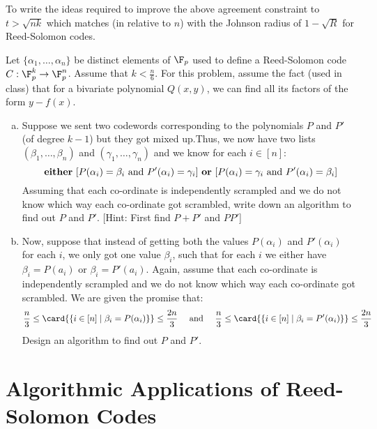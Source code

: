 \begin{curiousity}
To write the ideas required to improve the above agreement constraint to $t > \sqrt{nk}$ which matches (in relative to $n$) with the Johnson radius of $1-\sqrt{R}$ for Reed-Solomon codes.
\end{curiousity}

\begin{exercise-prob}
Let $\{\alpha_1, \ldots , \alpha_n\}$ be distinct elements of $\F_p$ used to define a Reed-Solomon code $C : \F_p^k \to \F_p^n$. Assume that $k < \frac{n}{6}$. For this problem, assume the fact (used in class) that for a bivariate polynomial $Q(x,y)$, we can
find all its factors of the form $y-f(x)$.
\begin{enumerate}[(a)]
\item Suppose we sent two codewords corresponding to the polynomials $P$ and $P'$ (of degree $k-1$) but they got mixed up.Thus, we now have two lists $(\beta_1, \ldots ,\beta_n)$ and
$(\gamma_1, \ldots, \gamma_n)$ and we know for each $i \in [n]$:
$$\textrm{ \textbf{either} [$P(\alpha_i) = \beta_i$ and $P'(\alpha_i) = \gamma_i$] \textbf{or} [$P(\alpha_i) = \gamma_i$ and $P'(\alpha_i) = \beta_i$]}$$
Assuming that each co-ordinate is independently scrampled and we do not know which way each co-ordinate got scrambled, write down an algorithm to find out $P$ and $P'$. [Hint: First find $P+P'$ and $PP'$]
\item Now, suppose that instead of getting both the values $P(\alpha_i)$ and $P'(\alpha_i)$ for each $i$, we only got one value $\beta_i$, such that for each $i$ we either have $\beta_i = P(a_i)$ or $\beta_i = P'(a_i)$. Again, assume that each co-ordinate is independently scrampled and we do not know which way each co-ordinate got scrambled. We are given the promise that:
$$\frac{n}{3} \le \card{\{ i \in [n] \mid \beta_i = P(\alpha_i) \}} \le \frac{2n}{3} \textrm{ ~~~and~~~ } \frac{n}{3} \le \card{\{ i \in [n] \mid \beta_i = P'(\alpha_i) \}} \le \frac{2n}{3}$$
Design an algorithm to find out $P$ and $P'$. 
\end{enumerate}
\end{exercise-prob}

\section{Algorithmic Applications of Reed-Solomon Codes}

